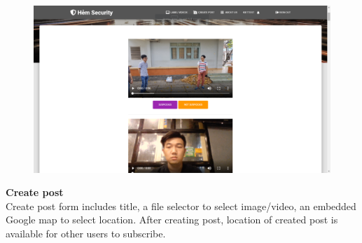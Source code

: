 \begin{center}
    \begin{figure}[H]
    \centering
    \includegraphics[width=1\columnwidth]{images/chap4/label_video.png}
    \end{figure}
\end{center}
\textbf{Create post}
\\
Create post form includes title, a file selector to select image/video, an embedded Google map to select location. After creating post, location of created post is available for other users to subscribe.

